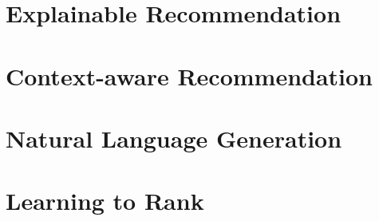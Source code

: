 \section{Explainable Recommendation}

\lipsum[1-3]

\section{Context-aware Recommendation}

\lipsum[1-3]

\section{Natural Language Generation}

\lipsum[1-3]

\section{Learning to Rank}

\lipsum[1-3]


